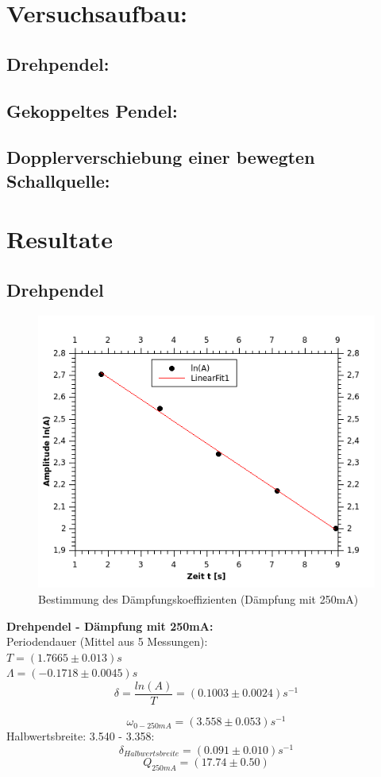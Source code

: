 \documentclass[12pt,a4paper]{article}
\begin{document}
\begin{multicols}{2}
\section{Versuchsaufbau:}
\subsection{Drehpendel:}

\subsection{Gekoppeltes Pendel:}

\subsection{Dopplerverschiebung einer bewegten Schallquelle:}
\pagebreak
\section{Resultate}
\subsection{Drehpendel}

\begin{figure}[H]
	\centering
	\includegraphics[scale=1.8]{./figure/Messung1_Daempfung_omega0.png}
	\caption{Bestimmung des Dämpfungskoeffizienten (Dämpfung mit 250mA)}
	\label{fig:daempfung_omega0_1}
\end{figure}

\noindent \textbf{Drehpendel - Dämpfung mit 250mA:}\\
Periodendauer (Mittel aus 5 Messungen):\\
$T = (1.7665 \pm 0.013)s$\\
$\Lambda = (-0.1718 \pm 0.0045)s$
$$\delta = \frac{ln(A)}{T} = (0.1003 \pm 0.0024)s^{-1}$$

$$\omega_{0 - 250mA}=(3.558 \pm 0.053)s^{-1}$$
Halbwertsbreite: 3.540 - 3.358:\\
$$\delta_{Halbwertsbreite} = (0.091 \pm 0.010)s^{-1}$$
$$Q_{250mA}=(17.74 \pm 0.50)$$


\end{multicols}
\end{document}
